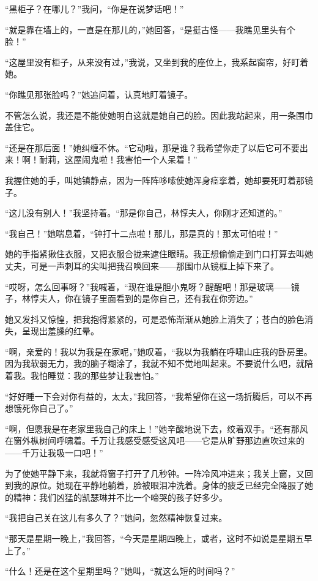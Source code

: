 \par “黑柜子？在哪儿？”我问，“你是在说梦话吧！”
\par “就是靠在墙上的，一直是在那儿的，”她回答，“是挺古怪——我瞧见里头有个脸！”
\par “这屋里没有柜子，从来没有过，”我说，又坐到我的座位上，我系起窗帘，好盯着她。
\par “你瞧见那张脸吗？”她追问着，认真地盯着镜子。
\par 不管怎么说，我还是不能使她明白这就是她自己的脸。因此我站起来，用一条围巾盖住它。
\par “还是在那后面！”她纠缠不休。“它动啦，那是谁？我希望你走了以后它可不要出来！啊！耐莉，这屋闹鬼啦！我害怕一个人呆着！”
\par 我握住她的手，叫她镇静点，因为一阵阵哆嗦使她浑身痉挛着，她却要死盯着那镜子。
\par “这儿没有别人！”我坚持着。“那是你自己，林惇夫人，你刚才还知道的。”
\par “我自己！”她喘息着，“钟打十二点啦！那儿，那是真的！那太可怕啦！”
\par 她的手指紧揪住衣服，又把衣服合拢来遮住眼睛。我正想偷偷走到门口打算去叫她丈夫，可是一声刺耳的尖叫把我召唤回来——那围巾从镜框上掉下来了。
\par “哎呀，怎么回事呀？”我喊着，“现在谁是胆小鬼呀？醒醒吧！那是玻璃——镜子，林惇夫人，你在镜子里面看到的是你自己，还有我在你旁边。”
\par 她又发抖又惊惶，把我抱得紧紧的，可是恐怖渐渐从她脸上消失了；苍白的脸色消失，呈现出羞臊的红晕。
\par “啊，亲爱的！我以为我是在家呢，”她叹着，“我以为我躺在呼啸山庄我的卧房里。因为我软弱无力，我的脑子糊涂了，我就不知不觉地叫起来。不要说什么吧，就陪着我。我怕睡觉：我的那些梦让我害怕。”
\par “好好睡一下会对你有益的，太太，”我回答，“我希望你在这一场折腾后，可以不再想饿死你自己了。”
\par “啊，但愿我是在老家里我自己的床上！”她辛酸地说下去，绞着双手。“还有那风在窗外枞树间呼啸着。千万让我感受感受这风吧——它是从旷野那边直吹过来的——千万让我吸一口吧！”
\par 为了使她平静下来，我就将窗子打开了几秒钟。一阵冷风冲进来；我关上窗，又回到我的原位。她现在平静地躺着，脸被眼泪冲洗着。身体的疲乏已经完全降服了她的精神：我们凶猛的凯瑟琳并不比一个啼哭的孩子好多少。
\par “我把自己关在这儿有多久了？”她问，忽然精神恢复过来。
\par “那天是星期一晚上，”我回答，“今天是星期四晚上，或者，这时不如说是星期五早上了。”
\par “什么！还是在这个星期里吗？”她叫，“就这么短的时间吗？”
